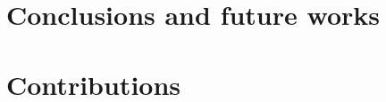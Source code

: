 \documentclass[twocolumn, switch]{article} %
\begin{document}
\section{Conclusions and future works}
\label{sec:conclusions}

\section{Contributions}
\label{sec:contributions}



\normalsize



\end{document}
